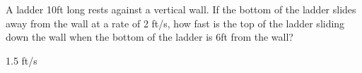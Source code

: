 \documentclass[12pt,letterpaper,addpoints]{exam}
\begin{document}
\begin{questions}
\newpage
\addpoints

\question[10] A ladder 10ft long rests against a vertical wall.  If the bottom of the ladder slides away from the wall at a rate of 2 ft/s, how fast is the top of the ladder sliding down the wall when the bottom of the ladder is 6ft from the wall?

\begin{solution}
1.5 ft/s
  \end{solution}












\end{questions}
\end{document}
